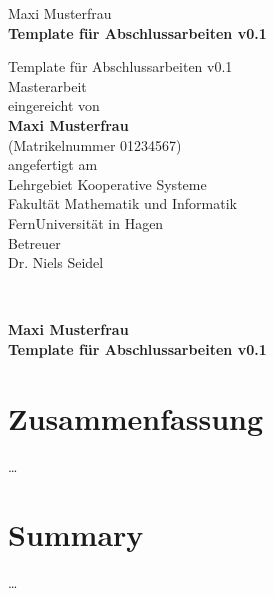 \documentclass[twoside,bibliography=totoc,openany]{fumi}
\title{\thesistitle}
\author{\thesisauthor}
\date{\today}
\newcommand{\thesistitle}{Template für Abschlussarbeiten v0.1}
\newcommand{\thesisauthor}{Maxi Musterfrau}
\newcommand{\thesistype}{Masterarbeit} %
\newcommand{\thesismatrikelnummer}{01234567}
\begin{document}
\sffamily
\pagestyle{empty}



\thesisauthor\\{\textbf{\thesistitle}}\vfill\newpage~\newpage

\vspace{2cm}
\begin{center}\LARGE
\vfill
{\Huge\thesistitle}\\
\vfill
\thesistype\\
\vfill
eingereicht von\\[4pt]
\textbf{\thesisauthor}\\[4pt]
(Matrikelnummer \thesismatrikelnummer)\\
\vfill
angefertigt am\\
Lehrgebiet Kooperative Systeme\\
Fakultät Mathematik und Informatik\\
FernUniversität in Hagen\\
\vfill 
Betreuer\\
Dr. Niels Seidel
\vfill
\monthname[\the\month] \the\year
\end{center}
\newpage~\newpage

{\large\textbf{\thesisauthor}\\\textbf{\thesistitle}\vfill}\newpage~\newpage


\section*{Zusammenfassung}
\dots\vfill
\section*{Summary}
\dots\vfill\newpage
\end{document}

